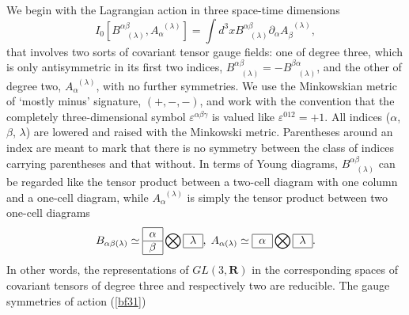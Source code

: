 \documentclass[a4paper,11pt]{article}
\begin{document}
We begin with the Lagrangian action in three space-time dimensions
\begin{equation}
I_{0}\left[ B_{\;\;\;(\lambda )}^{\alpha \beta },A_{\alpha }^{\;\;(\lambda
)}\right] =\int d^{3}xB_{\;\;\;(\lambda )}^{\alpha \beta }\partial _{\alpha
}A_{\beta }^{\;\;(\lambda )},  \label{bf31}
\end{equation}
that involves two sorts of covariant tensor gauge fields: one of degree
three, which is only antisymmetric in its first two indices, $%
B_{\;\;\;(\lambda )}^{\alpha \beta }=-B_{\;\;\;(\lambda )}^{\beta \alpha }$,
and the other of degree two, $A_{\alpha }^{\;\;(\lambda )}$, with no further
symmetries. We use the Minkowskian metric of `mostly minus' signature, $%
\left( +,-,-\right) $, and work with the convention that the completely
three-dimensional symbol $\varepsilon ^{\alpha \beta \gamma }$ is valued
like $\varepsilon ^{012}=+1$. All indices ($\alpha $, $\beta $, $\lambda $)
are lowered and raised with the Minkowski metric. Parentheses around an
index are meant to mark that there is no symmetry between the class of
indices carrying parentheses and that without. In terms of Young diagrams, $%
B_{\;\;\;(\lambda )}^{\alpha \beta }$ can be regarded like the tensor
product between a two-cell diagram with one column and a one-cell diagram,
while $A_{\alpha }^{\;\;(\lambda )}$ is simply the tensor product between
two one-cell diagrams
\begin{equation}
B_{\alpha \beta (\lambda )}\simeq
\begin{tabular}{|l|}
\hline
$\alpha $ \\ \hline
$\beta $ \\ \hline
\end{tabular}
\bigotimes
\begin{tabular}{|l|}
\hline
$\lambda $ \\ \hline
\end{tabular}
,\;A_{\alpha (\lambda )}\simeq
\begin{tabular}{|l|}
\hline
$\alpha $ \\ \hline
\end{tabular}
\bigotimes
\begin{tabular}{|l|}
\hline
$\lambda $ \\ \hline
\end{tabular}
.  \label{young}
\end{equation}
In other words, the representations of $GL\left( 3,\mathbf{R}\right) $ in
the corresponding spaces of covariant tensors of degree three and
respectively two are reducible. The gauge symmetries of action (\ref{bf31})
\end{document}
